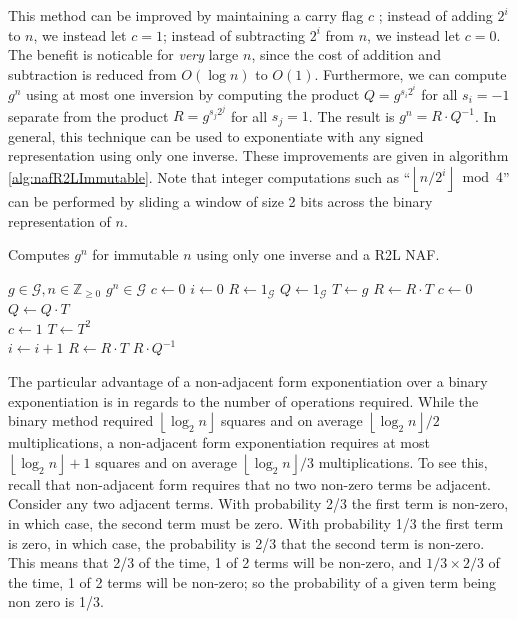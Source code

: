 \documentclass{ucalgthes1}
\theoremstyle{plain}
\theoremstyle{definition}
\newcommand{\ZZgez}{\mathbb{Z}_{\ge 0}}
\newcommand{\floor}[1]{\left\lfloor #1 \right\rfloor}
\begin{document}
This method can be improved by maintaining a carry flag $c$ \cite[p.4]{Joye2000}; instead of adding $2^i$ to $n$, we instead let $c = 1$; instead of subtracting $2^i$ from $n$, we instead let $c = 0$.  The benefit is noticable for \emph{very} large $n$, since the cost of addition and subtraction is reduced from $O(\log n)$ to $O(1)$.  Furthermore, we can compute $g^n$ using at most one inversion by computing the product $Q = g^{s_i2^i}$ for all $s_i = -1$ separate from the product $R = g^{s_j2^j}$ for all $s_j = 1$.  The result is $g^n = R \cdot Q^{-1}$.  In general, this technique can be used to exponentiate with any signed representation using only one inverse.  These improvements are given in algorithm \ref{alg:nafR2LImmutable}.  Note that integer computations such as ``$\floor{n/2^i} \bmod 4$'' can be performed by sliding a window of size 2 bits across the binary representation of $n$.

\begin{algorithm}[htb!]
\caption{Computes $g^n$ for immutable $n$ using only one inverse and a R2L NAF.}\label{alg:nafR2LImmutable}
\begin{algorithmic}[1]
\REQUIRE $g \in \mathcal G, n \in \ZZgez$
\ENSURE $g^n \in \mathcal G$
\STATE $c \gets 0$ 
\STATE $i \gets 0$
\STATE $R \gets 1_{\mathcal G}$ 
\STATE $Q \gets 1_{\mathcal G}$ 
\STATE $T \gets g$ 
	\IF {$\floor{n/2^i}+c \equiv 1 \pmod 4$}
		\STATE $R \gets R \cdot T$
		\STATE $c \gets 0$
	\ELSIF {$\floor{n/2^i}+c \equiv 3 \pmod 4$}
		\STATE $Q \gets Q \cdot T$ \\
		\STATE $c \gets 1$
	\ENDIF
	\STATE $T \gets T^2$ \\
	\STATE $i \gets i+1$
\ENDWHILE
{} \STATE $R \gets R \cdot T$ \ENDIF
\RETURN $R \cdot Q^{-1}$
\end{algorithmic}
\end{algorithm}

The particular advantage of a non-adjacent form exponentiation over a binary exponentiation is in regards to the number of operations required.  While the binary method required $\floor{\log_2 n}$ squares and on average $\floor{\log_2 n}/2$ multiplications, a non-adjacent form exponentiation requires at most $\floor{\log_2 n}+1$ squares and on average $\floor{\log_2 n}/3$ multiplications.  To see this, recall that non-adjacent form requires that no two non-zero terms be adjacent.  Consider any two adjacent terms.  With probability 2/3 the first term is non-zero, in which case, the second term must be zero.  With probability 1/3 the first term is zero, in which case, the probability is 2/3 that the second term is non-zero.  This means that 2/3 of the time, 1 of 2 terms will be non-zero, and $1/3 \times 2/3$ of the time, 1 of 2 terms will be non-zero; so the probability of a given term being non zero is 1/3.
\end{document}
